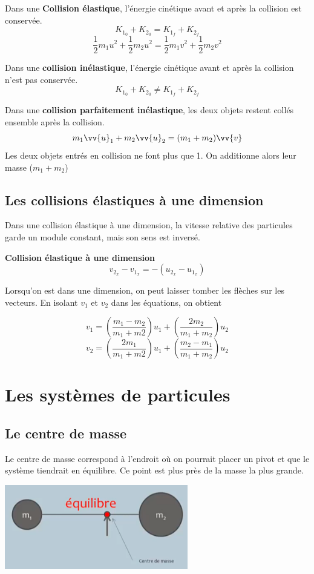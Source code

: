 \documentclass{article}
\begin{document}
Dans une \textbf{Collision élastique}, l'énergie cinétique avant et après la collision est conservée.
\[K_{1_0} + K_{2_0} = K_{1_f} + K_{2_f}\]
\[\frac{1}{2}m_1u^2 + \frac{1}{2}m_2u^2 = \frac{1}{2}m_1v^2 + \frac{1}{2}m_2v^2\]
\newline

Dans une \textbf{collision inélastique}, l'énergie cinétique avant et après la collision n'est pas conservée.
\[K_{1_0} + K_{2_0} \neq K_{1_f} + K_{2_f}\]

Dans une \textbf{collision parfaitement inélastique}, les deux objets restent collés ensemble après la collision.
\[m_1\vv{u}_1 + m_2\vv{u}_2 = (m_1 + m_2)\vv{v}\]
Les deux objets entrés en collision ne font plus que 1. On additionne alors leur masse ($m_1 + m_2$)

\subsection{Les collisions élastiques à une dimension}
Dans une collision élastique à une dimension, la vitesse relative des particules garde un module constant, mais son sens est inversé.
\newline

\noindent
\textbf{Collision élastique à une dimension}
\[v_{2_x} - v_{1_x} = -(u_{2_x} - u_{1_x})\]
\newline

Lorsqu'on est dans une dimension, on peut laisser tomber les flèches sur les vecteurs.
En isolant $v_1$ et $v_2$ dans les équations, on obtient 

\[v_1 = \left(\frac{m_1 - m_2}{m_1 + m2}\right)u_1 + \left(\frac{2m_2}{m_1 + m_2}\right)u_2\]
\[v_2 = \left(\frac{2m_1}{m_1 + m2}\right)u_1 + \left(\frac{m_2 - m_1}{m_1 + m_2}\right)u_2\]

\section{Les systèmes de particules}
\subsection{Le centre de masse}
Le centre de masse correspond à l'endroit où on pourrait placer un pivot et que le système tiendrait en équilibre. Ce point est plus près de la masse la plus grande.
\begin{center}
    \includegraphics[width=8cm]{Image/centreMasse.png}
\end{center}
\end{document}
